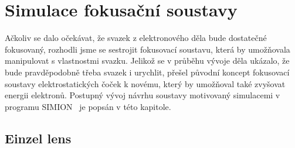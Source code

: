 \newpage
\chapter{Simulace fokusační soustavy}

Ačkoliv se dalo očekávat, že svazek z elektronového děla bude dostatečné fokusovaný, rozhodli jsme se sestrojit fokusovací soustavu, která by umožňovala manipulovat s vlastnostmi svazku. Jelikož se v průběhu vývoje děla ukázalo, že bude pravděpodobně třeba svazek i urychlit, přešel původní koncept fokusovací soustavy elektrostatických čoček k novému, který by umožňoval také zvyšovat energii elektronů. Postupný vývoj návrhu soustavy motivovaný simulacemi v programu SIMION~\cite{05Simion} je popsán v této kapitole.

\section{Einzel lens}

